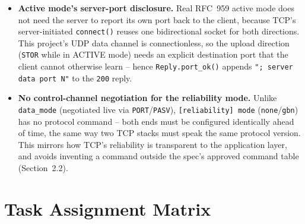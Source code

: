 \documentclass[11pt]{article}
\begin{document}
\begin{itemize}
    \item \textbf{Active mode's server-port disclosure.} Real RFC~959 active mode
          does not need the server to report its own port back to the client,
          because TCP's server-initiated \texttt{connect()} reuses one bidirectional
          socket for both directions. This project's UDP data channel is
          connectionless, so the upload direction (\texttt{STOR} while in ACTIVE
          mode) needs an explicit destination port that the client cannot otherwise
          learn -- hence \texttt{Reply.port\_ok()} appends
          \texttt{"; server data port N"} to the \texttt{200} reply.
    \item \textbf{No control-channel negotiation for the reliability mode.} Unlike
          \texttt{data\_mode} (negotiated live via \texttt{PORT}/\texttt{PASV}),
          \texttt{[reliability] mode} (\texttt{none}/\texttt{gbn}) has no protocol
          command -- both ends must be configured identically ahead of time, the
          same way two TCP stacks must speak the same protocol version. This
          mirrors how TCP's reliability is transparent to the application layer,
          and avoids inventing a command outside the spec's approved command table
          (Section~2.2).
\end{itemize}

\clearpage
\section{Task Assignment Matrix}
\end{document}
